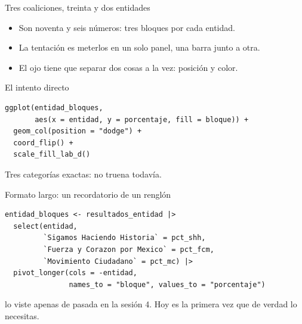 \begin{frame}{Tres coaliciones, treinta y dos entidades}
  \vspace{0.3em}
  \begin{itemize}\setlength{\itemsep}{0.85em}
    \item<1-> Son noventa y seis números: tres bloques por cada entidad.
    \item<2-> La tentación es meterlos en un solo panel, una barra junto
          a otra.
    \item<3-> El ojo tiene que separar dos cosas a la vez: posición y
          color.
  \end{itemize}

  \vspace{1.0em}
\end{frame}

\begin{frame}[fragile]{El intento directo}
\begin{lstlisting}
ggplot(entidad_bloques,
       aes(x = entidad, y = porcentaje, fill = bloque)) +
  geom_col(position = "dodge") +
  coord_flip() +
  scale_fill_lab_d()
\end{lstlisting}

  \vspace{0.6em}
  Tres categorías exactas:  no truena todavía.
\end{frame}

\begin{frame}[fragile]{Formato largo: un recordatorio de un renglón}
\begin{lstlisting}
entidad_bloques <- resultados_entidad |>
  select(entidad,
         `Sigamos Haciendo Historia` = pct_shh,
         `Fuerza y Corazon por Mexico` = pct_fcm,
         `Movimiento Ciudadano` = pct_mc) |>
  pivot_longer(cols = -entidad,
               names_to = "bloque", values_to = "porcentaje")
\end{lstlisting}

  \vspace{0.4em}
  {\small\color{grisTenue} lo viste apenas de pasada
  en la sesión 4. Hoy es la primera vez que de verdad lo necesitas.}
\end{frame}

